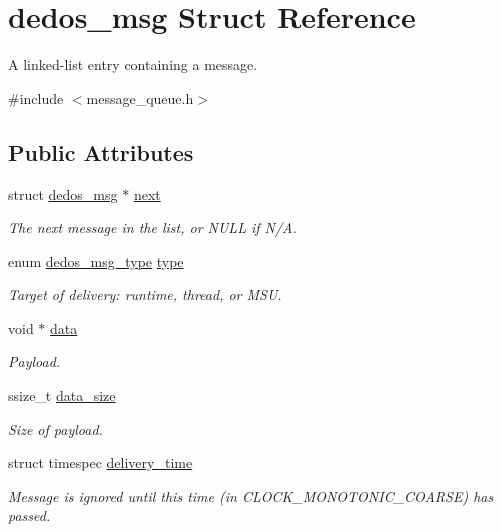 \hypertarget{structdedos__msg}{\section{dedos\-\_\-msg Struct Reference}
\label{structdedos__msg}
}


A linked-\/list entry containing a message.  




{\ttfamily \#include $<$message\-\_\-queue.\-h$>$}

\subsection*{Public Attributes}
\begin{DoxyCompactItemize}
\item 
struct \hyperlink{structdedos__msg}{dedos\-\_\-msg} $\ast$ \hyperlink{structdedos__msg_ab769ff04df992859169a7a456256bd04}{next}
\begin{DoxyCompactList}\small\item\em The next message in the list, or N\-U\-L\-L if N/\-A. \end{DoxyCompactList}\item 
enum \hyperlink{message__queue_8h_ade4286e2189401663d8ce0287895570a}{dedos\-\_\-msg\-\_\-type} \hyperlink{structdedos__msg_af4d233fc84b050bee1af851fd420d317}{type}
\begin{DoxyCompactList}\small\item\em Target of delivery\-: runtime, thread, or M\-S\-U. \end{DoxyCompactList}\item 
void $\ast$ \hyperlink{structdedos__msg_a91f31ca1c757b98cbc2de7bf7c18cb49}{data}
\begin{DoxyCompactList}\small\item\em Payload. \end{DoxyCompactList}\item 
ssize\-\_\-t \hyperlink{structdedos__msg_a336dcb0b72f421b1e99dc23f76d4bcd1}{data\-\_\-size}
\begin{DoxyCompactList}\small\item\em Size of payload. \end{DoxyCompactList}\item 
struct timespec \hyperlink{structdedos__msg_a178267be123a7471f2ec7e4a74d598fd}{delivery\-\_\-time}
\begin{DoxyCompactList}\small\item\em Message is ignored until this time (in C\-L\-O\-C\-K\-\_\-\-M\-O\-N\-O\-T\-O\-N\-I\-C\-\_\-\-C\-O\-A\-R\-S\-E) has passed. \end{DoxyCompactList}\end{DoxyCompactItemize}


